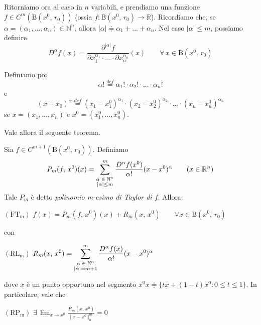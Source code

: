 Ritorniamo ora al caso in $n$ variabili, e prendiamo una funzione $f \in C^m(\mathrm{B}(x^0,\,r_0))$ (ossia $f : \mathrm{B}(x^0,\,r_0) \rightarrow \mathbb{R}$). Ricordiamo che, se $\alpha = (\alpha_1,\ldots,\alpha_n) \in \mathbb{N}^n$, allora $|\alpha| \doteqdot \alpha_1 + \ldots + \alpha_n$. Nel caso $|\alpha| \leq m$, possiamo definire
$$
D^{\alpha} f(x) = \frac{\partial^{|\alpha|}f}{\partial x_1^{\alpha_1} \cdot \ldots \cdot \partial x_n^{\alpha_n}}(x) \qquad \forall \, x \in \mathrm{B}(x^0,\,r_0)
$$

Definiamo poi
$$
\alpha! \overset{def}{=} \alpha_1! \cdot \alpha_2! \cdot \ldots \cdot \alpha_n!
$$
e
$$
(x-x_0)^{\alpha} \overset{def}{=} (x_1-x_1^0)^{\alpha_1} \cdot (x_2-x_2^0)^{\alpha_2} \cdot \ldots \cdot (x_n-x_n^0)^{\alpha_n}
$$
se $x=(x_1,\ldots,x_n)$ e $x^0=(x_1^0,\ldots,x_n^0)$.

Vale allora il seguente teorema.

\begin{thm}
Sia $f \in C^{m+1}(\mathrm{B}(x^0,\,r_0))$. Definiamo
$$
P_m(f,\,x^0)(x) = \sum_{\overset{\text{\scriptsize $\alpha \in \mathbb{N}^n$}}{|\alpha| \leq m}}^{m} \frac{D^{\alpha} f(x^0)}{\alpha!}(x-x^0)^{\alpha}
\qquad (x \in \mathbb{R}^n)
$$
Tale $P_m$ è detto \emph{polinomio m-esimo di Taylor di $f$}. Allora:
\begin{center}
$\mathrm{(FT_m)}$
\hfill
$\displaystyle f(x) = P_m(f,\,x^0)(x)+R_m(x,\,x^0) \qquad \forall x \in \mathrm{B}(x^0,\,r_0)$
\hfill \null \\
\end{center}
con
\begin{center}
$\mathrm{(RL_m)}$
\hfill
$\displaystyle R_m(x,\,x^0) = \sum_{\overset{\text{\scriptsize $\alpha \in \mathbb{N}^n$}}{|\alpha| = m+1}}^{m} \frac{D^{\alpha} f(\overline{x})}{\alpha!}(x-x^0)^{\alpha}$
\hfill \null \\
\end{center}
dove $\overline{x}$ è un punto opportuno nel segmento $x^0x \doteqdot \lbrace tx + (1-t)x^0 : 0 \leq t \leq 1 \rbrace$. In particolare, vale che
\begin{center}
$\mathrm{(RP_m)}$
\hfill
$\displaystyle \exists \, \lim_{x \rightarrow x^0} \frac{R_m(x,\,x^0)}{||x-x^0||_n^m} = 0$
\hfill \null \\
\end{center}
\end{thm}


